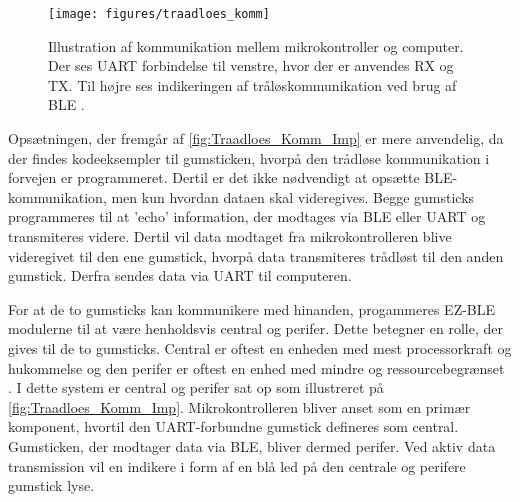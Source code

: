 \begin{figure}[H]
	\centering
	\texttt{[image: figures/traadloes\_komm]}
	\caption{Illustration af kommunikation mellem mikrokontroller og computer. Der ses UART forbindelse til venstre, hvor der er anvendes RX og TX. Til højre ses indikeringen af tråløskommunikation ved brug af BLE \citep{cypresspsoc2015, cypresspsoc42015}.} 
	\label{fig:Traadloes_Komm_Imp}
\end{figure}

\noindent
Opsætningen, der fremgår af \autoref{fig:Traadloes_Komm_Imp} er mere anvendelig, da der findes kodeeksempler til gumsticken, hvorpå den trådløse kommunikation i forvejen er programmeret. Dertil er det ikke nødvendigt at opsætte BLE-kommunikation, men kun hvordan dataen skal videregives. 
Begge gumsticks programmeres til at 'echo' information, der modtages via BLE eller UART og transmiteres videre. Dertil vil data modtaget fra mikrokontrolleren blive videregivet til den ene gumstick, hvorpå data transmiteres trådløst til den anden gumstick. Derfra sendes data via UART til computeren. 

For at de to gumsticks kan kommunikere med hinanden, progammeres EZ-BLE modulerne til at være henholdsvis central og perifer. Dette betegner en rolle, der gives til de to gumsticks. Central er oftest en enheden med mest processorkraft og hukommelse og den perifer er oftest en enhed med mindre og ressourcebegrænset \citep{townsend2014}. I dette system er central og perifer sat op som illustreret på \autoref{fig:Traadloes_Komm_Imp}. Mikrokontrolleren bliver anset som en primær komponent, hvortil den UART-forbundne gumstick defineres som central. Gumsticken, der modtager data via BLE, bliver dermed perifer. Ved aktiv data transmission vil en indikere i form af en blå led på den centrale og perifere gumstick lyse.